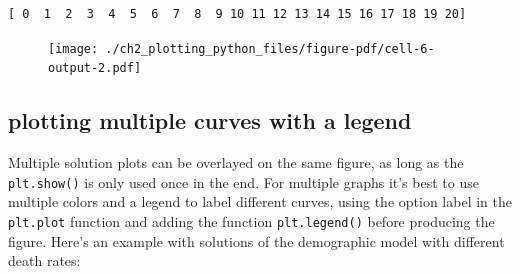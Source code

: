 \documentclass[
  letterpaper,
  DIV=11,
  numbers=noendperiod]{scrreprt}
\begin{document}
\begin{verbatim}
[ 0  1  2  3  4  5  6  7  8  9 10 11 12 13 14 15 16 17 18 19 20]
\end{verbatim}

\begin{figure}[H]

{\centering \texttt{[image: ./ch2\_plotting\_python\_files/figure-pdf/cell-6-output-2.pdf]}

}

\end{figure}

\hypertarget{plotting-multiple-curves-with-a-legend}{%
\subsection{plotting multiple curves with a
legend}\label{plotting-multiple-curves-with-a-legend}}

Multiple solution plots can be overlayed on the same figure, as long as
the \texttt{plt.show()} is only used once in the end. For multiple
graphs it's best to use multiple colors and a legend to label different
curves, using the option label in the \texttt{plt.plot} function and
adding the function \texttt{plt.legend()} before producing the figure.
Here's an example with solutions of the demographic model with different
death rates:
\end{document}

